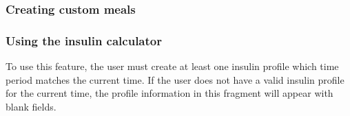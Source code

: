 \subsubsection{Creating custom meals}

\subsubsection{Using the insulin calculator}

To use this feature, the user must create at least one insulin profile which time period matches the current time. If the user does not have a valid insulin profile for the current
time, the profile information in this fragment will appear with blank fields.\\

\begin{figure}[H]
    \captionsetup[subfigure]{justification=centering}
    \begin{center}
        \begin{subfigure}{.3\textwidth}

\end{subfigure}
\end{center}
\end{figure}
